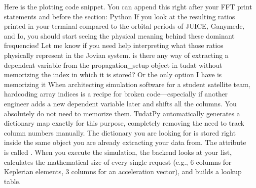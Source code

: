 {}Here is the plotting code snippet. You can append this right after your FFT print statements and before the  section:\markdownRendererInterblockSeparator
{}Python\markdownRendererInterblockSeparator
{}\markdownRendererInterblockSeparator
{}If you look at the resulting ratios printed in your terminal compared to the orbital periods of JUICE, Ganymede, and Io, you should start seeing the physical meaning behind these dominant frequencies! Let me know if you need help interpreting what those ratios physically represent in the Jovian system.\markdownRendererInterblockSeparator
{}\markdownRendererThematicBreak{}\markdownRendererInterblockSeparator
{}
\markdownRendererSectionEnd \markdownRendererSectionBegin
{}\markdownRendererInterblockSeparator
{}is there any way of extracting a dependent variable from the propagation_setup object in tudat without memorizing the index in which it is stored? Or the only option I have is memorizing it\markdownRendererInterblockSeparator
{}
\markdownRendererSectionEnd \markdownRendererSectionBegin
{}\markdownRendererInterblockSeparator
{}When architecting simulation software for a student satellite team, hardcoding array indices is a recipe for broken code—especially if another engineer adds a new dependent variable later and shifts all the columns. You absolutely do not need to memorize them.\markdownRendererInterblockSeparator
{}TudatPy automatically generates a dictionary map exactly for this purpose, completely removing the need to track column numbers manually.\markdownRendererInterblockSeparator
{}\markdownRendererSectionBegin
{}\markdownRendererInterblockSeparator
{}The dictionary you are looking for is stored right inside the same  object you are already extracting your data from.\markdownRendererInterblockSeparator
{}The attribute is called .\markdownRendererInterblockSeparator
{}
\markdownRendererSectionEnd \markdownRendererSectionBegin
{}\markdownRendererInterblockSeparator
{}When you execute the simulation, the backend looks at your  list, calculates the mathematical size of every single request (e.g., 6 columns for Keplerian elements, 3 columns for an acceleration vector), and builds a lookup table.\markdownRendererInterblockSeparator
